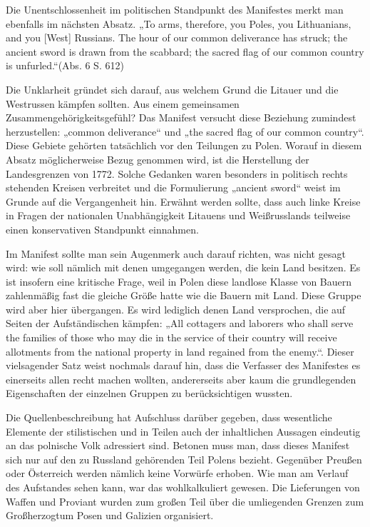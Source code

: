 \documentclass{../../sem_paper}
\begin{document}
Die Unentschlossenheit im politischen Standpunkt des Manifestes merkt man ebenfalls im nächsten
Absatz. „To arms, therefore, you Poles, you Lithuanians, and you [West] Russians. The hour of our
common deliverance has struck; the ancient sword is drawn from the scabbard; the sacred flag of
our common country is unfurled.“(Abs. 6 S. 612)

Die Unklarheit gründet sich darauf, aus welchem Grund die Litauer und die Westrussen kämpfen
sollten. Aus einem gemeinsamen Zusammengehörigkeitsgefühl? Das Manifest versucht diese
Beziehung zumindest herzustellen: „common deliverance“ und „the sacred flag of our common country“.
Diese Gebiete gehörten tatsächlich vor den Teilungen zu Polen. Worauf in diesem Absatz
möglicherweise Bezug genommen wird, ist die Herstellung der Landesgrenzen von 1772. Solche
Gedanken waren besonders in politisch rechts stehenden Kreisen verbreitet und die Formulierung
„ancient sword“ weist im Grunde auf die Vergangenheit hin.\autocite[25]{kowalski1954} Erwähnt werden sollte, dass auch
linke Kreise in Fragen der nationalen Unabhängigkeit Litauens und Weißrusslands teilweise einen
konservativen Standpunkt einnahmen.

Im Manifest sollte man sein Augenmerk auch darauf richten, was nicht gesagt wird: wie soll
nämlich mit denen umgegangen werden, die kein Land besitzen. Es ist insofern eine kritische Frage,
weil in Polen diese landlose Klasse von Bauern zahlenmäßig fast die gleiche Größe hatte wie die
Bauern mit Land.\autocite[15]{kowalski1954} Diese Gruppe wird aber hier übergangen. Es wird lediglich denen Land
versprochen, die auf Seiten der Aufständischen kämpfen: „All cottagers and laborers who shall
serve the families of those who may die in the service of their country will receive allotments from
the national property in land regained from the enemy.“. Dieser vielsagender Satz weist nochmals
darauf hin, dass die Verfasser des Manifestes es einerseits allen recht machen wollten, andererseits
aber kaum die grundlegenden Eigenschaften der einzelnen Gruppen zu berücksichtigen wussten.

\newpage
{}

Die Quellenbeschreibung hat Aufschluss darüber gegeben, dass wesentliche Elemente der stilistischen und
in Teilen auch der inhaltlichen Aussagen eindeutig an das polnische Volk adressiert sind. Betonen
muss man, dass dieses Manifest sich nur auf den zu Russland gehörenden Teil Polens bezieht.
Gegenüber Preußen oder Österreich werden nämlich keine Vorwürfe erhoben. Wie man am Verlauf
des Aufstandes sehen kann, war das wohlkalkuliert gewesen. Die Lieferungen von
Waffen und Proviant wurden zum großen Teil über die umliegenden Grenzen zum Großherzogtum
Posen und Galizien organisiert.
\end{document}
